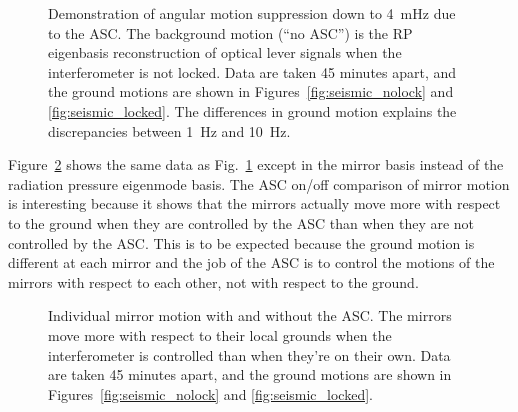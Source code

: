 \begin{figure}
\begin{centering}
\caption[Angular motion suppression due to the ASC]{Demonstration of
  angular motion suppression down to 4~mHz due to the ASC. 
The background motion (``no ASC'') is the RP eigenbasis reconstruction of optical lever signals
  when the interferometer is not locked. Data are taken 45 minutes
  apart, and the ground motions are shown in
  Figures~\ref{fig:seismic_nolock} and \ref{fig:seismic_locked}. The
  differences in ground motion explains the discrepancies between 1~Hz
  and 10~Hz.}
\label{fig:ASConoff}
\end{centering}
\end{figure}

Figure~\ref{fig:mirror_onoff} shows the same data as
Fig.~\ref{fig:ASConoff} except in the mirror basis instead of the
radiation pressure eigenmode basis. The ASC on/off comparison of
mirror motion is interesting because it shows that the mirrors
actually move more with respect to the ground when they are controlled
by the ASC than when they are not controlled by the ASC. This is to be
expected because the ground motion is different at each mirror and the
job of the ASC is to control the motions of the mirrors with respect
to each other, not with respect to the ground.

\begin{figure}
\begin{centering}
\caption[Individual mirror motion with and without ASC]{Individual
  mirror motion with and without the ASC. The mirrors move more with
  respect to their local grounds when the interferometer is controlled
  than when they're on their own. Data are taken 45 minutes apart, and the ground
  motions are shown in Figures~\ref{fig:seismic_nolock} and
  \ref{fig:seismic_locked}.}
\label{fig:mirror_onoff}
\end{centering}
\end{figure}







